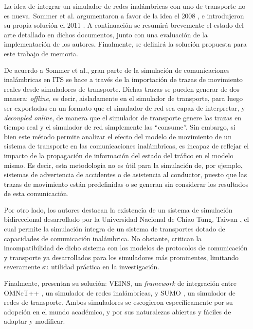 La idea de integrar un simulador de redes inalámbricas con uno de transporte no es nueva. Sommer et al. argumentaron a favor de la idea el 2008 \cite{bidirectionalsimul}, e introdujeron su propia solución el 2011 \cite{sommer_german_dressler}. A continuación se resumirá brevemente el estado del arte detallado en dichos documentos, junto con una evaluación de la implementación de los autores. Finalmente, se definirá la solución propuesta para este trabajo de memoria.

De acuerdo a Sommer et al., gran parte de la simulación de comunicaciones inalámbricas en ITS se hace a través de la importación de trazas de movimiento reales desde simuladores de transporte. Dichas trazas se pueden generar de dos manera: \textit{offline}, es decir, aisladamente en el simulador de transporte, para luego ser exportadas en un formato que el simulador de red sea capaz de interpretar, y \textit{decoupled online}, de manera que el simulador de transporte genere las trazas en tiempo real y el simulador de red simplemente las ``consume''. Sin embargo, si bien este método permite analizar el efecto del modelo de movimiento de un sistema de transporte en las comunicaciones inalámbricas, es incapaz de reflejar el impacto de la propagación de información del estado del tráfico en el modelo mismo. Es decir, esta metodología no es útil para la simulación de, por ejemplo, sistemas de advertencia de accidentes o de asistencia al conductor, puesto que las trazas de movimiento están predefinidas o se generan sin considerar los resultados de esta comunicación.

Por otro lado, los autores destacan la existencia de un sistema de simulación bidireccional desarrollado por la Universidad Nacional de Chiao Tung, Taiwan \cite{nctuns}, el cual permite la simulación íntegra de un sistema de transportes dotado de capacidades de comunicación inalámbrica. No obstante, critican la incompatibilidad de dicho sistema con los modelos de protocolos de comunicación y transporte ya desarrollados para los simuladores más prominentes, limitando severamente su utilidad práctica en la investigación.


Finalmente, presentan su solución: VEINS, un \textit{framework} de integración entre OMNeT++ \cite{omnet2008overview}, un simulador de redes inalámbricas, y SUMO \cite{sumo}, un simulador de redes de transporte. Ambos simuladores se escogieron específicamente por su adopción en el mundo académico, y por sus naturalezas abiertas y fáciles de adaptar y modificar.

